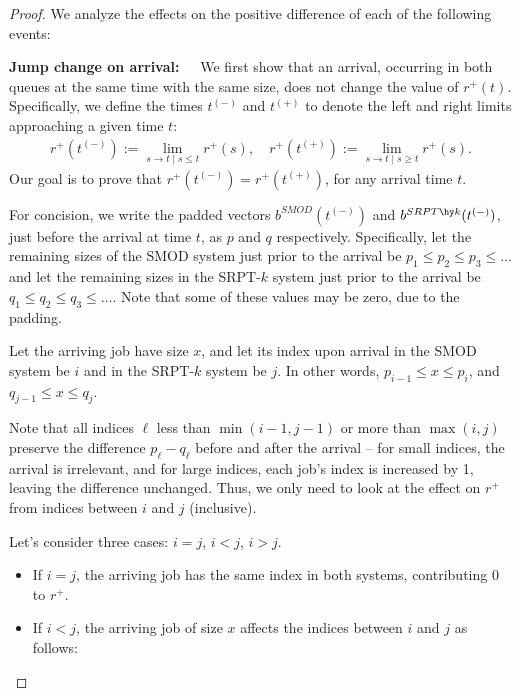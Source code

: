 \documentclass[acmsmall]{acmart}
\begin{document}
\begin{proof}
We analyze the effects on the positive difference of each of the following events:

\textbf{Jump change on arrival:~~}
    We first show that an arrival, occurring in both queues at the same time with the same size,
    does not change the value of $r^+(t)$.
    Specifically, we define the times $t^{(-)}$ and $t^{(+)}$ to denote the left and right limits approaching a given time $t$:
    \begin{align*}
        r^+(t^{(-)}) := \lim_{s \to t \mid s \le t} r^+(s),\quad
        r^+(t^{(+)}) := \lim_{s \to t \mid s \ge t} r^+(s).
    \end{align*}
    Our goal is to prove that $r^+(t^{(-)}) = r^+(t^{(+)})$, for any arrival time $t$.

    For concision, we write the padded vectors $b^{SMOD}(t^{(-)})$ and $b^{SRPT\hy k}(t^{(-)})$, just before the arrival at time $t$, as $p$ and $q$ respectively.
    Specifically, let the remaining sizes of the SMOD system just prior to the arrival be $p_1 \le  p_2 \le  p_3 \le \ldots$
    and let the remaining sizes in the SRPT-$k$ system just prior to the arrival be $q_1 \le q_2 \le q_3 \le \ldots$. Note that some of these values may be zero, due to the padding.

    Let the arriving job have size $x$, and let its index upon arrival in the SMOD system be $i$ and in the SRPT-$k$ system be $j$. In other words, $p_{i-1} \le x \le p_i$, and $q_{j-1} \le x \le q_j$.

    Note that all indices $\ell$ less than $\min(i-1, j-1)$ or more than $\max(i, j)$ preserve the difference $p_\ell-q_\ell$ before and after the arrival -- for small indices, the arrival is irrelevant, and for large indices, each job's index is increased by 1, leaving the difference unchanged. Thus, we only need to look at the effect on $r^+$ from indices between $i$ and $j$ (inclusive).

    Let's consider three cases: $i=j$, $i<j$, $i>j$. 
    \begin{itemize}
        \item If $i=j$, the arriving job has the same index in both systems, contributing 0 to $r^+$. 
    
        \item If $i<j$, the arriving job of size $x$ affects the indices between $i$ and $j$ as follows:


\end{itemize}
\end{proof}
\end{document}
